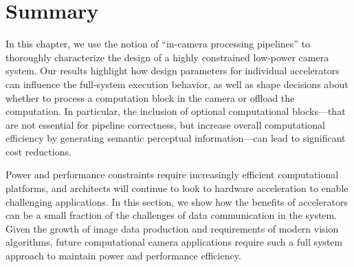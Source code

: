 


\section{Summary}
 \label{sec:nsp-conclusion}

In this chapter, we use the notion of ``in-camera processing pipelines'' to thoroughly characterize the design of a highly constrained low-power camera system.
Our results highlight how design parameters for individual accelerators can influence the full-system execution behavior, as well as shape decisions about whether to process a computation block in the camera or offload the computation.
In particular, the inclusion of optional computational blocks---that are not essential for pipeline correctness, but increase overall computational efficiency by generating semantic perceptual information---can lead to significant cost reductions.

Power and performance constraints require increasingly efficient computational platforms, and architects will continue to look to hardware acceleration to enable challenging applications.
In this section, we show how the benefits of accelerators can be a small fraction of the challenges of data communication in the system.
Given the growth of image data production and requirements of modern vision algorithms, future computational camera applications require such a full system approach to maintain power and performance efficiency.






